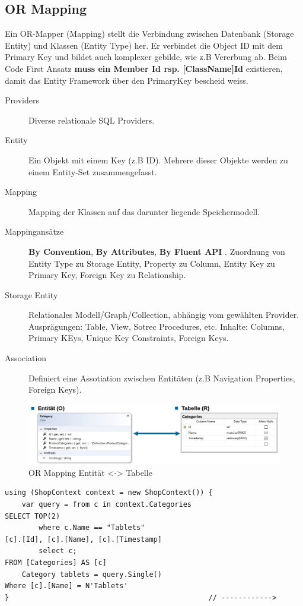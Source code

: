 \documentclass[
a4paper,
oneside,
10pt,
fleqn,
headsepline,
toc=listofnumbered, 
bibliography=totocnumbered]{scrartcl}
\begin{document}
\subsection{OR Mapping}
Ein OR-Mapper (Mapping) stellt die Verbindung zwischen Datenbank (Storage Entity) und Klassen (Entity Type) her. Er verbindet die Object ID mit dem Primary Key und bildet auch komplexer gebilde, wie z.B Vererbung ab. Beim Code First Ansatz \textbf{muss ein Member Id rsp. [ClassName]Id} existieren, damit das Entity Framework über den PrimaryKey bescheid weiss.
\begin{description}
	\item[Providers] Diverse relationale SQL Providers.
	\item[Entity] Ein Objekt mit einem Key (z.B ID). Mehrere dieser Objekte werden zu einem Entity-Set zusammengefasst.
	\item[Mapping] Mapping der Klassen auf das darunter liegende Speichermodell.
	\item[Mappingansätze] \textbf{By Convention}, \textbf{By Attributes}, \textbf{By Fluent API} . Zuordnung von Entity Type zu Storage Entity, Property zu Column, Entity Key zu Primary Key, Foreign Key zu Relationship.
	\item[Storage Entity] Relationales Modell/Graph/Collection, abhängig vom gewählten Provider. Ausprägungen: Table, View, Sotrec Procedures, etc. Inhalte: Columns, Primary KEys, Unique Key Constraints, Foreign Keys.
	\item[Association] Definiert eine Assotiation zwischen Entitäten (z.B Navigation Properties, Foreign Keys).
\end{description}

\begin{figure}[ht]
	\centering
	\includegraphics[width=0.8\linewidth]{images/entityframework_or_mapping.png}
	\caption{OR Mapping Entität <-> Tabelle}
	\label{fig:entityframeworkormapping}
\end{figure}
\begin{lstlisting}
using (ShopContext context = new ShopContext()) {
    var query = from c in context.Categories                            SELECT TOP(2)
        where c.Name == "Tablets"                                           [c].[Id], [c].[Name], [c].[Timestamp]
        select c;                                                       FROM [Categories] AS [c]
    Category tablets = query.Single()                                   Where [c].[Name] = N'Tablets'
}                                               // ------------>
\end{lstlisting}
\end{document}
